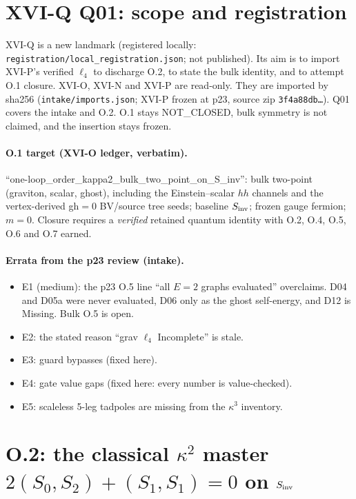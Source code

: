 \section{XVI-Q Q01: scope and registration}
XVI-Q is a new landmark (registered locally: \texttt{registration/local\_registration.json}; not published). Its aim
is to import XVI-P's verified $\ell_4$ to discharge O.2, to state the bulk identity, and to attempt O.1 closure.
XVI-O, XVI-N and XVI-P are read-only. They are imported by sha256 (\texttt{intake/imports.json}; XVI-P frozen at p23,
source zip \texttt{3f4a88db\ldots}). Q01 covers the intake and O.2. O.1 stays NOT\_CLOSED, bulk symmetry is not
claimed, and the insertion stays frozen.

\paragraph{O.1 target (XVI-O ledger, verbatim).} ``one-loop\_order\_kappa2\_bulk\_two\_point\_on\_S\_inv'': bulk
two-point (graviton, scalar, ghost), including the Einstein--scalar $hh$ channels and the vertex-derived gh$=0$
BV/source tree seeds; baseline $S_{\rm inv}$; frozen gauge fermion; $m=0$. Closure requires a \emph{verified}
retained quantum identity with O.2, O.4, O.5, O.6 and O.7 earned.

\paragraph{Errata from the p23 review (intake).}
\begin{itemize}
\item E1 (medium): the p23 O.5 line ``all $E=2$ graphs evaluated'' overclaims. D04 and D05a were never evaluated,
D06 only as the ghost self-energy, and D12 is Missing. Bulk O.5 is open.
\item E2: the stated reason ``grav $\ell_4$ Incomplete'' is stale.
\item E3: guard bypasses (fixed here).
\item E4: gate value gaps (fixed here: every number is value-checked).
\item E5: scaleless 5-leg tadpoles are missing from the $\kappa^3$ inventory.
\end{itemize}

\section{O.2: the classical $\kappa^2$ master $2(S_0,S_2)+(S_1,S_1)=0$ on $S_{\rm inv}$}
